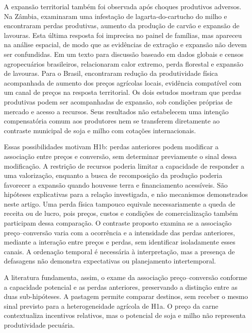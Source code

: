 A expansão territorial também foi observada após choques produtivos adversos. Na Zâmbia,  examinaram uma infestação de lagarta-do-cartucho do milho e encontraram perdas produtivas, aumento da produção de carvão e expansão de lavouras. Esta última resposta foi imprecisa no painel de famílias, mas apareceu na análise espacial, de modo que as evidências de extração e expansão não devem ser confundidas. Em um texto para discussão baseado em dados globais e censos agropecuários brasileiros,  relacionaram calor extremo, perda florestal e expansão de lavouras. Para o Brasil, encontraram redução da produtividade física acompanhada de aumento dos preços agrícolas locais, evidência compatível com um canal de preços na resposta territorial. Os dois estudos mostram que perdas produtivas podem ser acompanhadas de expansão, sob condições próprias de mercado e acesso a recursos. Seus resultados não estabelecem uma intenção compensatória comum aos produtores nem se transferem diretamente ao contraste municipal de soja e milho com cotações internacionais.

Essas possibilidades motivam H1b: perdas anteriores podem modificar a associação entre preços e conversão, sem determinar previamente o sinal dessa modificação. A restrição de recursos poderia limitar a capacidade de responder a uma valorização, enquanto a busca de recomposição da produção poderia favorecer a expansão quando houvesse terra e financiamento acessíveis. São hipóteses explicativas para a relação investigada, e não mecanismos demonstrados neste artigo. Uma perda física tampouco equivale necessariamente a queda de receita ou de lucro, pois preços, custos e condições de comercialização também participam dessa comparação. O contraste proposto examina se a associação preço--conversão varia com a ocorrência e a intensidade das perdas anteriores, mediante a interação entre preços e perdas, sem identificar isoladamente esses canais. A ordenação temporal é necessária à interpretação, mas a presença de defasagens não demonstra expectativas ou planejamento intertemporal.

A literatura fundamenta, assim, o exame da associação preço--conversão conforme a capacidade potencial e as perdas anteriores, preservando a distinção entre as duas sub-hipóteses. A pastagem permite comparar destinos, sem receber o mesmo sinal previsto para a heterogeneidade agrícola de H1a. O preço da carne contextualiza incentivos relativos, mas o potencial de soja e milho não representa produtividade pecuária.

